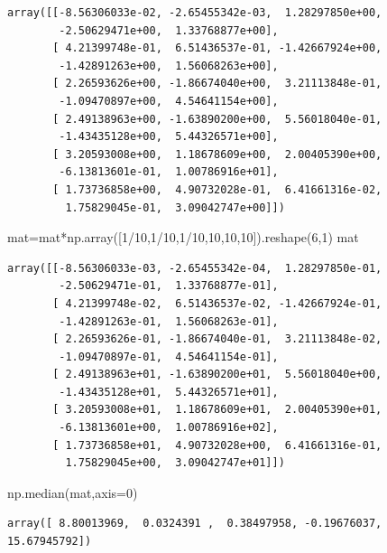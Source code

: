 \documentclass[
  a4paper,
  DIV=11,
  numbers=noendperiod]{scrreprt}
\newenvironment{Shaded}{\begin{snugshade}}{\end{snugshade}}
\newcommand{\DecValTok}[1]{\textcolor[rgb]{0.68,0.00,0.00}{#1}}
\newcommand{\NormalTok}[1]{\textcolor[rgb]{0.00,0.23,0.31}{#1}}
\newcommand{\OperatorTok}[1]{\textcolor[rgb]{0.37,0.37,0.37}{#1}}
\begin{document}
\begin{verbatim}
array([[-8.56306033e-02, -2.65455342e-03,  1.28297850e+00,
        -2.50629471e+00,  1.33768877e+00],
       [ 4.21399748e-01,  6.51436537e-01, -1.42667924e+00,
        -1.42891263e+00,  1.56068263e+00],
       [ 2.26593626e+00, -1.86674040e+00,  3.21113848e-01,
        -1.09470897e+00,  4.54641154e+00],
       [ 2.49138963e+00, -1.63890200e+00,  5.56018040e-01,
        -1.43435128e+00,  5.44326571e+00],
       [ 3.20593008e+00,  1.18678609e+00,  2.00405390e+00,
        -6.13813601e-01,  1.00786916e+01],
       [ 1.73736858e+00,  4.90732028e-01,  6.41661316e-02,
         1.75829045e-01,  3.09042747e+00]])
\end{verbatim}

\begin{Shaded}
\begin{Highlighting}[]
\NormalTok{mat}\OperatorTok{=}\NormalTok{mat}\OperatorTok{*}\NormalTok{np.array([}\DecValTok{1}\OperatorTok{/}\DecValTok{10}\NormalTok{,}\DecValTok{1}\OperatorTok{/}\DecValTok{10}\NormalTok{,}\DecValTok{1}\OperatorTok{/}\DecValTok{10}\NormalTok{,}\DecValTok{10}\NormalTok{,}\DecValTok{10}\NormalTok{,}\DecValTok{10}\NormalTok{]).reshape(}\DecValTok{6}\NormalTok{,}\DecValTok{1}\NormalTok{)}
\NormalTok{mat}
\end{Highlighting}
\end{Shaded}

\begin{verbatim}
array([[-8.56306033e-03, -2.65455342e-04,  1.28297850e-01,
        -2.50629471e-01,  1.33768877e-01],
       [ 4.21399748e-02,  6.51436537e-02, -1.42667924e-01,
        -1.42891263e-01,  1.56068263e-01],
       [ 2.26593626e-01, -1.86674040e-01,  3.21113848e-02,
        -1.09470897e-01,  4.54641154e-01],
       [ 2.49138963e+01, -1.63890200e+01,  5.56018040e+00,
        -1.43435128e+01,  5.44326571e+01],
       [ 3.20593008e+01,  1.18678609e+01,  2.00405390e+01,
        -6.13813601e+00,  1.00786916e+02],
       [ 1.73736858e+01,  4.90732028e+00,  6.41661316e-01,
         1.75829045e+00,  3.09042747e+01]])
\end{verbatim}

\begin{Shaded}
\begin{Highlighting}[]
\NormalTok{np.median(mat,axis}\OperatorTok{=}\DecValTok{0}\NormalTok{)}
\end{Highlighting}
\end{Shaded}

\begin{verbatim}
array([ 8.80013969,  0.0324391 ,  0.38497958, -0.19676037, 15.67945792])
\end{verbatim}
\end{document}
